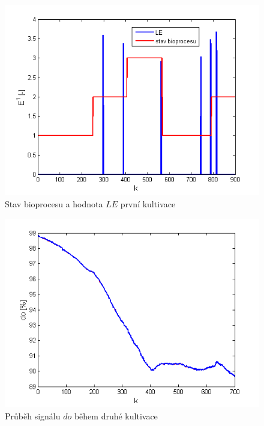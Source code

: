 \documentclass[11pt,twoside,openright]{report}
\begin{document}
\begin{appendices}
\begin{figure}
    \centering
    \includegraphics[scale=0.8]{IMG/artep/artep17_4.png}
    \caption{Stav bioprocesu a hodnota $LE$ první kultivace}
    \label{fig:artep_5}
\end{figure}

\begin{figure}
    \centering
    \includegraphics[scale=0.8]{IMG/artep/artep17_2.png}
    \caption{Průběh signálu $do$ během druhé kultivace}
    \label{fig:artep_2}
\end{figure}


\end{appendices}
\end{document}
